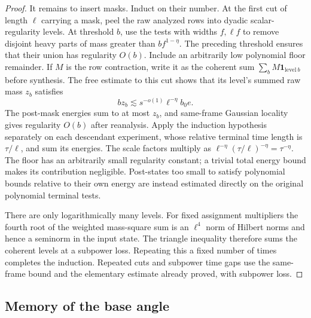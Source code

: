 \begin{proof}
It remains to insert masks. Induct on their number. At the first cut of
length $\ell$ carrying a mask, peel the raw analyzed rows into dyadic
scalar-regularity levels. At threshold $b$, use the tests with widths
$f,\ell f$ to remove disjoint heavy parts of mass greater than
$bf^{1-\eta}$. The preceding threshold ensures that their union has
regularity $O(b)$. Include an arbitrarily low polynomial floor remainder.
If $M$ is the row contraction, write it as the coherent sum
$\sum_bM\mathbf1_{\mathrm{level}\ b}$ before synthesis. The free
estimate to this cut shows that its level's summed raw mass $z_b$
satisfies
\[
 b z_b\lesssim s^{-o(1)}\ell^{-\eta}b_0e.
\]
The post-mask energies sum to at most $z_b$, and same-frame Gaussian
locality gives regularity $O(b)$ after reanalysis. Apply the induction
hypothesis separately on each descendant experiment, whose relative
terminal time length is $\tau/\ell$, and sum its energies. The scale
factors multiply as
$\ell^{-\eta}(\tau/\ell)^{-\eta}=\tau^{-\eta}$.
The floor has an arbitrarily small regularity constant; a trivial total
energy bound makes its contribution negligible. Post-states too small to
satisfy polynomial bounds relative to their own energy are instead
estimated directly on the original polynomial terminal tests.

There are only logarithmically many levels. For fixed assignment
multipliers the fourth root of the weighted mass-square sum is an
$\ell^4$ norm of Hilbert norms and hence a seminorm in the input state.
The triangle inequality therefore sums the coherent levels at a
subpower loss. Repeating this a fixed number of times completes the
induction. Repeated cuts and subpower time gaps use the same-frame bound
and the elementary estimate already proved, with subpower loss.
\end{proof}

\subsection{Memory of the base angle}

